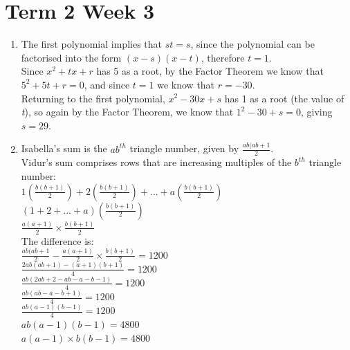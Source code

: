\documentclass[../main.tex]{subfiles}
\begin{document}
\section*{Term 2 Week 3}
\begin{enumerate}
    \item 
    The first polynomial implies that \(st=s\), since the polynomial can be factorised into the form \((x-s)(x-t)\), therefore \(t=1\).\\

    Since \(x^2+tx+r\) has 5 as a root, by the Factor Theorem we know that \(5^2+5t+r=0\), and since \(t=1\) we know that \(r=-30\).\\

    Returning to the first polynomial, \(x^2-30x+s\) has 1 as a root (the value of \textit{t}), so again by the Factor Theorem, we know that \(1^2-30+s=0\), giving \(s=29\).\\
    
    \item 
    Isabella's sum is the \(ab^{th}\) triangle number, given by \(\frac{ab(ab+1}{2}\).\\

    Vidur's sum comprises rows that are increasing multiples of the \(b^{th}\) triangle number:\\
    \(1(\frac{b(b+1)}{2})+2(\frac{b(b+1)}{2})+...+a(\frac{b(b+1)}{2})\)\\
    \((1+2+...+a)(\frac{b(b+1)}{2})\)\\
    \(\frac{a(a+1)}{2} \times \frac{b(b+1)}{2}\)\\

    The difference is:\\
    \(\frac{ab(ab+1}{2}-\frac{a(a+1)}{2} \times \frac{b(b+1)}{2}=1200\)\\
    
    \(\frac{2ab(ab+1)-(a+1)(b+1)}{4}=1200\)\\
    
    \(\frac{ab(2ab+2-ab-a-b-1)}{4}=1200\)\\

    \(\frac{ab(ab-a-b+1)}{4}=1200\)\\

    \(\frac{ab(a-1)(b-1)}{4}=1200\)\\

    \(ab(a-1)(b-1)=4800\)\\

    \(a(a-1)\times b(b-1)=4800\)\\


\end{enumerate}
\end{document}
